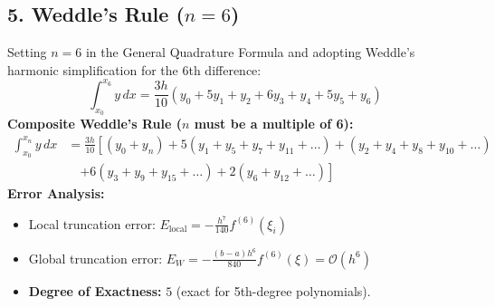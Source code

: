 \subsection{5. Weddle's Rule \texorpdfstring{($n = 6$)}{(n = 6)}}
\begin{theorembox}
Setting $n = 6$ in the General Quadrature Formula and adopting Weddle's harmonic simplification for the 6th difference:
\begin{equation}
    \boxed{\int_{x_0}^{x_6} y \, dx = \frac{3 h}{10} (y_0 + 5 y_1 + y_2 + 6 y_3 + y_4 + 5 y_5 + y_6)}
\end{equation}
\textbf{Composite Weddle's Rule ($n$ must be a multiple of 6):}
\begin{align}
    \int_{x_0}^{x_n} y \, dx &= \frac{3 h}{10} \left[ (y_0 + y_n) + 5(y_1 + y_5 + y_7 + y_{11} + \dots) + (y_2 + y_4 + y_8 + y_{10} + \dots) \right. \nonumber \\
    &\quad \left. + 6(y_3 + y_9 + y_{15} + \dots) + 2(y_6 + y_{12} + \dots) \right]
\end{align}
\textbf{Error Analysis:}
\begin{itemize}[noitemsep]
    \item Local truncation error: $E_{\text{local}} = -\frac{h^7}{140} f^{(6)}(\xi_i)$
    \item Global truncation error: $\boxed{E_W = -\frac{(b-a) h^6}{840} f^{(6)}(\xi) = \mathcal{O}(h^6)}$
    \item \textbf{Degree of Exactness:} $5$ (exact for 5th-degree polynomials).
\end{itemize}
\end{theorembox}

